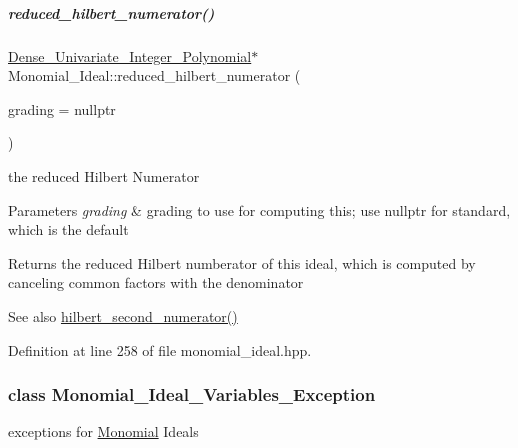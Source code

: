 \mbox{\label{group__polygroup_a814e71b7c8df465869708bbcdf8f6007}} 
\subparagraph{\texorpdfstring{reduced\+\_\+hilbert\+\_\+numerator()}{reduced\_hilbert\_numerator()}}
{\footnotesize\ttfamily \hyperlink{group__polygroup_class_dense___univariate___integer___polynomial}{Dense\+\_\+\+Univariate\+\_\+\+Integer\+\_\+\+Polynomial}$\ast$ Monomial\+\_\+\+Ideal\+::reduced\+\_\+hilbert\+\_\+numerator (\begin{DoxyParamCaption}\item[{const W\+T\+\_\+\+T\+Y\+PE $\ast$}]{grading = {\ttfamily nullptr} }\end{DoxyParamCaption})\hspace{0.3cm}{\ttfamily [inline]}}



the reduced Hilbert Numerator 


\begin{DoxyParams}{Parameters}
{\em grading} & grading to use for computing this; use {\ttfamily nullptr} for standard, which is the default \\
\hline
\end{DoxyParams}
\begin{DoxyReturn}{Returns}
the reduced Hilbert numberator of this ideal, which is computed by canceling common factors with the denominator 
\end{DoxyReturn}
\begin{DoxySeeAlso}{See also}
\hyperlink{group__commalg_ga572e81ac2dce2e17ab459e9a0b687084}{hilbert\+\_\+second\+\_\+numerator()} 
\end{DoxySeeAlso}


Definition at line 258 of file monomial\+\_\+ideal.\+hpp.

\label{class_monomial___ideal___variables___exception}
\subsubsection{class Monomial\+\_\+\+Ideal\+\_\+\+Variables\+\_\+\+Exception}
exceptions for \hyperlink{group__polygroup_class_monomial}{Monomial} Ideals 

